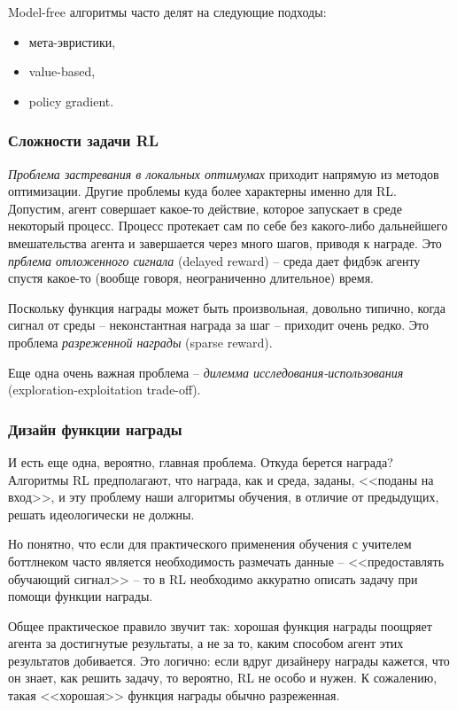 \documentclass[%
	11pt,
	a4paper,
	utf8,
		]{article}
\begin{document}
Model-free алгоритмы часто делят на следующие подходы:
\begin{itemize}
	\item мета-эвристики,
	
	\item value-based,
	
	\item policy gradient.
\end{itemize}

\subsubsection{Сложности задачи RL}

\emph{Проблема застревания в локальных оптимумах} приходит напрямую из методов оптимизации. Другие проблемы куда более характерны именно для RL. Допустим, агент совершает какое-то действие, которое запускает в среде некоторый процесс. Процесс протекает сам по себе без какого-либо дальнейшего вмешательства агента и завершается через много шагов, приводя к награде. Это \emph{прблема отложенного сигнала} (delayed reward) -- среда дает фидбэк агенту спустя какое-то (вообще говоря, неограниченно длительное) время.

Поскольку функция награды может быть произвольная, довольно типично, когда сигнал от среды -- неконстантная награда за шаг -- приходит очень редко. Это проблема \emph{разреженной награды} (sparse reward).

Еще одна очень важная проблема -- \emph{дилемма исследования-использования} (exploration-exploitation trade-off). 

\subsubsection{Дизайн функции награды}

И есть еще одна, вероятно, главная проблема. Откуда берется награда? Алгоритмы RL предполагают, что награда, как и среда, заданы, <<поданы на вход>>, и эту проблему наши алгоритмы обучения, в отличие от предыдущих, решать идеологически не должны.

Но понятно, что если для практического применения обучения с учителем боттлнеком часто является необходимость размечать данные -- <<предоставлять обучающий сигнал>> -- то в RL необходимо аккуратно описать задачу при помощи функции награды.

Общее практическое правило звучит так: хорошая функция награды поощряет агента за достигнутые результаты, а не за то, каким способом агент этих результатов добивается. Это логично: если вдруг дизайнеру награды кажется, что он знает, как решить задачу, то вероятно, RL не особо и нужен. К сожалению, такая <<хорошая>> функция награды обычно разреженная.
\end{document}
